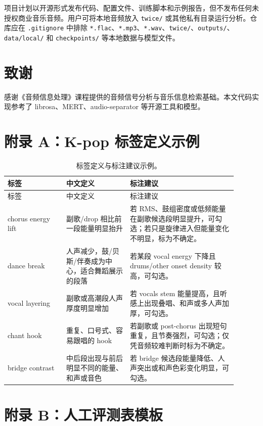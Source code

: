 \documentclass[UTF8,zihao=-4]{ctexart}
\begin{document}
项目计划以开源形式发布代码、配置文件、训练脚本和示例报告，但不发布任何未授权商业音乐音频。用户可将本地音频放入 \texttt{twice/} 或其他私有目录运行分析。仓库应在 \texttt{.gitignore} 中排除 \texttt{*.flac}、\texttt{*.mp3}、\texttt{*.wav}、\texttt{twice/}、\texttt{outputs/}、\texttt{data/local/} 和 \texttt{checkpoints/} 等本地数据与模型文件。

\section*{致谢}

感谢《音频信息处理》课程提供的音频信号分析与音乐信息检索基础。本文代码实现参考了 librosa、MERT、audio-separator 等开源工具和模型。




\appendix
\section{附录 A：K-pop 标签定义示例}

\begin{longtable}{p{0.23\linewidth}p{0.25\linewidth}p{0.42\linewidth}}
\caption{标签定义与标注建议示例。}\\
\toprule
标签 & 中文定义 & 标注建议 \\
\midrule
\endfirsthead
\toprule
标签 & 中文定义 & 标注建议 \\
\midrule
\endhead
chorus energy lift & 副歌/drop 相比前一段能量明显抬升 & 若 RMS、鼓组密度或低频能量在副歌候选段明显提升，可勾选；若只是旋律进入但能量变化不明显，标为不确定。 \\
dance break & 人声减少，鼓/贝斯/伴奏成为中心，适合舞蹈展示的段落 & 若某段 vocal energy 下降且 drums/other onset density 较高，可勾选。 \\
vocal layering & 副歌或高潮段人声厚度明显增加 & 若 vocals stem 能量提高，且听感上出现叠唱、和声或多人声加厚，可勾选。 \\
chant hook & 重复、口号式、容易跟唱的 hook & 若副歌或 post-chorus 出现短句重复，且节奏强烈，可勾选；仅凭音频较难判断时标为不确定。 \\
bridge contrast & 中后段出现与前后明显不同的能量、和声或音色 & 若 bridge 候选段能量降低、人声突出或和声色彩变化明显，可勾选。 \\
\bottomrule
\end{longtable}

\section{附录 B：人工评测表模板}
\end{document}
